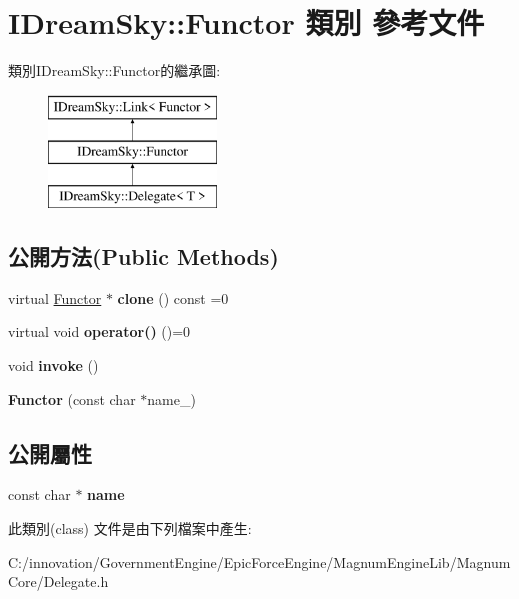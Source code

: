 \hypertarget{class_i_dream_sky_1_1_functor}{}\section{I\+Dream\+Sky\+:\+:Functor 類別 參考文件}
\label{class_i_dream_sky_1_1_functor}
類別\+I\+Dream\+Sky\+:\+:Functor的繼承圖\+:\begin{figure}[H]
\begin{center}
\leavevmode
\includegraphics[height=3.000000cm]{class_i_dream_sky_1_1_functor}
\end{center}
\end{figure}
\subsection*{公開方法(Public Methods)}
\begin{DoxyCompactItemize}
\item 
virtual \hyperlink{class_i_dream_sky_1_1_functor}{Functor} $\ast$ {\bfseries clone} () const  =0\hypertarget{class_i_dream_sky_1_1_functor_a966c96d9838a088fd55508a91526553a}{}\label{class_i_dream_sky_1_1_functor_a966c96d9838a088fd55508a91526553a}

\item 
virtual void {\bfseries operator()} ()=0\hypertarget{class_i_dream_sky_1_1_functor_a6aef3a7e004a02517f79afbf49b9f7d5}{}\label{class_i_dream_sky_1_1_functor_a6aef3a7e004a02517f79afbf49b9f7d5}

\item 
void {\bfseries invoke} ()\hypertarget{class_i_dream_sky_1_1_functor_a3d0b1e0a4b1c93ea9643d075220136ad}{}\label{class_i_dream_sky_1_1_functor_a3d0b1e0a4b1c93ea9643d075220136ad}

\item 
{\bfseries Functor} (const char $\ast$name\+\_)\hypertarget{class_i_dream_sky_1_1_functor_a3a71c7f8598c45e0bb1d8ad30435bd5e}{}\label{class_i_dream_sky_1_1_functor_a3a71c7f8598c45e0bb1d8ad30435bd5e}

\end{DoxyCompactItemize}
\subsection*{公開屬性}
\begin{DoxyCompactItemize}
\item 
const char $\ast$ {\bfseries name}\hypertarget{class_i_dream_sky_1_1_functor_aad27ae0b2fc11b2350ceda17f38d6b03}{}\label{class_i_dream_sky_1_1_functor_aad27ae0b2fc11b2350ceda17f38d6b03}

\end{DoxyCompactItemize}


此類別(class) 文件是由下列檔案中產生\+:\begin{DoxyCompactItemize}
\item 
C\+:/innovation/\+Government\+Engine/\+Epic\+Force\+Engine/\+Magnum\+Engine\+Lib/\+Magnum\+Core/Delegate.\+h\end{DoxyCompactItemize}

